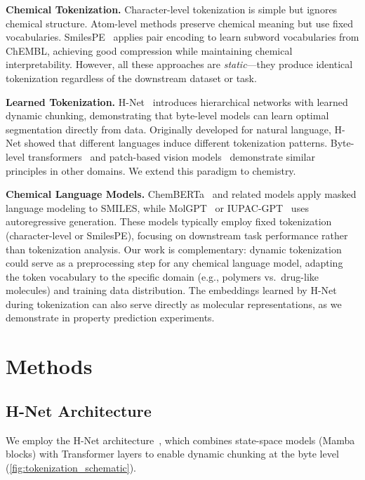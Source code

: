 \documentclass{article}
\newcommand{\hnet}{H-Net}
\newcommand{\smilespe}{SmilesPE}
\begin{document}
\textbf{Chemical Tokenization.}
Character-level tokenization is simple but ignores chemical structure. Atom-level methods preserve chemical meaning but use fixed vocabularies. \smilespe{}~\citep{li2020smilespe} applies pair encoding to learn subword vocabularies from ChEMBL, achieving good compression while maintaining chemical interpretability. However, all these approaches are \emph{static}---they produce identical tokenization regardless of the downstream dataset or task.

\textbf{Learned Tokenization.}
\hnet{}~\citep{hwang2025hnet} introduces hierarchical networks with learned dynamic chunking, demonstrating that byte-level models can learn optimal segmentation directly from data. Originally developed for natural language, \hnet{} showed that different languages induce different tokenization patterns. Byte-level transformers~\citep{wang2022blt} and patch-based vision models~\citep{dosovitskiy2020vit} demonstrate similar principles in other domains. We extend this paradigm to chemistry.

\textbf{Chemical Language Models.}
ChemBERTa~\citep{chithrananda2020chemberta} and related models apply masked language modeling to SMILES, while MolGPT~\citep{bagal2021molegpt} or IUPAC-GPT~\citep{mao2025iupac} uses autoregressive generation. These models typically employ fixed tokenization (character-level or \smilespe{}), focusing on downstream task performance rather than tokenization analysis. Our work is complementary: dynamic tokenization could serve as a preprocessing step for any chemical language model, adapting the token vocabulary to the specific domain (e.g., polymers vs.\ drug-like molecules) and training data distribution. The embeddings learned by \hnet{} during tokenization can also serve directly as molecular representations, as we demonstrate in property prediction experiments.

\section{Methods}
\label{sec:methods}

\subsection{H-Net Architecture}

We employ the \hnet{} architecture~\citep{hwang2025hnet}, which combines state-space models (Mamba blocks) with Transformer layers to enable dynamic chunking at the byte level (\cref{fig:tokenization_schematic}).
\end{document}
